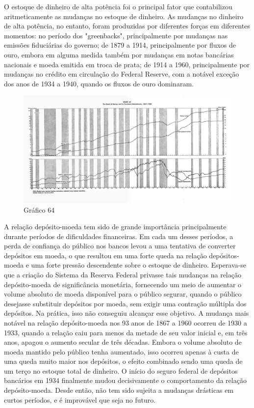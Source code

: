 \documentclass[12pt]{article}
\begin{document}
O estoque de dinheiro de alta potência foi o principal fator que contabilizou aritmeticamente as mudanças no estoque de dinheiro. As mudanças no dinheiro de alta potência, no entanto, foram produzidas por diferentes forças em diferentes momentos: no período dos "greenbacks", principalmente por mudanças nas emissões fiduciárias do governo; de 1879 a 1914, principalmente por fluxos de ouro, embora em alguma medida também por mudanças em notas bancárias nacionais e moeda emitida em troca de prata; de 1914 a 1960, principalmente por mudanças no crédito em circulação do Federal Reserve, com a notável exceção dos anos de 1934 a 1940, quando os fluxos de ouro dominaram.

\begin{figure}[H]
    \centering
    \caption{Gráfico 64}
    \includegraphics[width=1.0\textwidth]{4º Período/História do Pensamento Econômico/Tradução HPE/Tradução Tópico 9.1/Gráfico 64.png}
    \end{figure}

A relação depósito-moeda tem sido de grande importância principalmente durante períodos de dificuldades financeiras. Em cada um desses períodos, a perda de confiança do público nos bancos levou a uma tentativa de converter depósitos em moeda, o que resultou em uma forte queda na relação depósitos-moeda e uma forte pressão descendente sobre o estoque de dinheiro. Esperava-se que a criação do Sistema da Reserva Federal privasse tais mudanças na relação depósito-moeda de significância monetária, fornecendo um meio de aumentar o volume absoluto de moeda disponível para o público segurar, quando o público desejasse substituir depósitos por moeda, sem exigir uma contração múltipla dos depósitos. Na prática, isso não conseguiu alcançar esse objetivo. A mudança mais notável na relação depósito-moeda nos 93 anos de 1867 a 1960 ocorreu de 1930 a 1933, quando a relação caiu para menos da metade de seu valor inicial e, em três anos, apagou o aumento secular de três décadas. Embora o volume absoluto de moeda mantido pelo público tenha aumentado, isso ocorreu apenas à custa de uma queda muito maior nos depósitos, o efeito combinado sendo uma queda de um terço no estoque total de dinheiro. O início do seguro federal de depósitos bancários em 1934 finalmente mudou decisivamente o comportamento da relação depósito-moeda. Desde então, não tem sido sujeita a mudanças drásticas em curtos períodos, e é improvável que seja no futuro.
\end{document}
